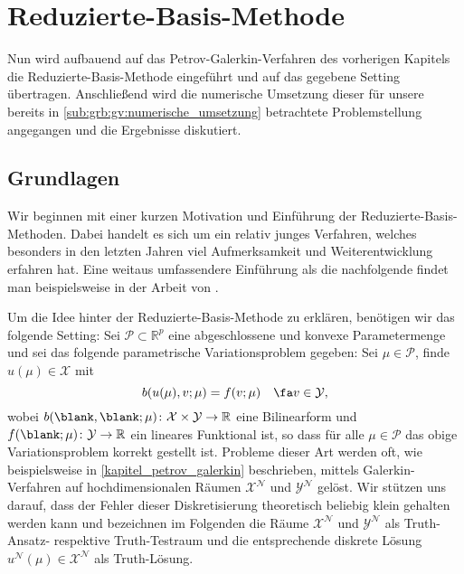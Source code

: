 
\chapter{Reduzierte-Basis-Methode} %
\label{chapter:rbm}


Nun wird aufbauend auf das Petrov-Galerkin-Verfahren des vorherigen Kapitels die Reduzierte-Basis-Methode eingeführt und auf das gegebene Setting übertragen.
Anschließend wird die numerische Umsetzung dieser für unsere bereits in \cref{sub:grb:gv:numerische_umsetzung} betrachtete Problemstellung angegangen und die Ergebnisse diskutiert.

\section{Grundlagen} %
\label{sub:grb:rb:grundlagen}

Wir beginnen mit einer kurzen Motivation und Einführung der Reduzierte-Basis-Methoden.
Dabei handelt es sich um ein relativ junges Verfahren, welches besonders in den letzten Jahren viel Aufmerksamkeit und Weiterentwicklung erfahren hat.
Eine weitaus umfassendere Einführung als die nachfolgende findet man beispielsweise in der Arbeit von \textcite{Patera:2007un}.

Um die Idee hinter der Reduzierte-Basis-Methode zu erklären, benötigen wir das folgende Setting: Sei $\mathcal P \subset \mathbb{R}^{p}$ eine abgeschlossene und konvexe Parametermenge und sei das folgende parametrische Variationsproblem gegeben:
Sei $\mu \in \mathcal P$, finde $u(\mu) \in \mathcal X$ mit
\begin{equation}
    \label{eq:rbm_varprob_allgemein}
    b(u(\mu), v; \mu) = f(v; \mu) \quad \fa v \in \mathcal Y,
\end{equation}
wobei $b(\blank, \blank; \mu) \colon \mathcal X \times \mathcal Y \to \mathbb{R}$ eine Bilinearform und $f(\blank; \mu) \colon \mathcal Y \to \mathbb{R}$ ein lineares Funktional ist, so dass für alle $\mu \in \mathcal P$ das obige Variationsproblem korrekt gestellt ist.
Probleme dieser Art werden oft, wie beispielsweise in \autoref{kapitel_petrov_galerkin} beschrieben, mittels Galerkin-Verfahren auf hochdimensionalen Räumen $\mathcal X^{\mathcal N}$ und $\mathcal Y^{\mathcal N}$ gelöst.
Wir stützen uns darauf, dass der Fehler dieser Diskretisierung theoretisch beliebig klein gehalten werden kann und bezeichnen im Folgenden die Räume $\mathcal X^{\mathcal N}$ und $\mathcal Y^{\mathcal N}$ als Truth-Ansatz- respektive Truth-Testraum und die entsprechende diskrete Lösung $u^{\mathcal N}(\mu) \in \mathcal X^{\mathcal N}$ als Truth-Lösung.

